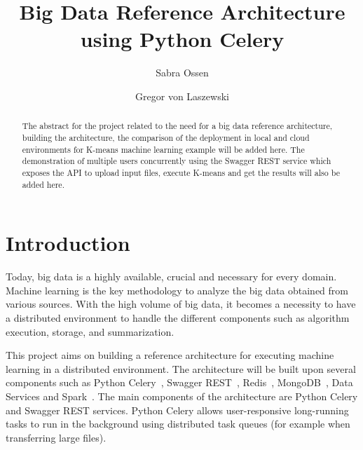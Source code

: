 
\title{Big Data Reference Architecture using Python Celery}


\author{Sabra Ossen}

\author{Gregor von Laszewski}


\renewcommand{\shortauthors}{G. v. Laszewski}


\begin{abstract}
The abstract for the project related to the need for a big data reference 
architecture, building the architecture, the comparison of the deployment in 
local and cloud environments for K-means machine learning example will be added 
here. The demonstration of multiple users concurrently using the Swagger REST 
service which exposes the API to upload input files, execute K-means and get 
the 
results will also be added here.
\end{abstract}



\maketitle

\section{Introduction}

Today, big data is a highly available, crucial and necessary for every domain. 
Machine learning is the key methodology to analyze the big data obtained from 
various sources. With the high volume of big data, it becomes a necessity to 
have a distributed environment to handle the different components such as 
algorithm execution, storage, and summarization. 

This project aims on building a reference architecture for executing 
machine learning in a distributed environment. The architecture will be built 
upon several components such as Python 
Celery~\cite{hid-sp18-416-www-python-celery}, Swagger 
REST~\cite{hid-sp18-416-www-swagger}, Redis~\cite{hid-sp18-416-www-redis}, 
MongoDB~\cite{hid-sp18-416-www-mongodb}, Data Services and 
Spark~\cite{hid-sp18-416-www-apache-spark}. The main components of the 
architecture are Python Celery and Swagger REST services. Python Celery allows 
user-responsive long-running tasks to run in the background using distributed 
task queues (for example when transferring large files). 

